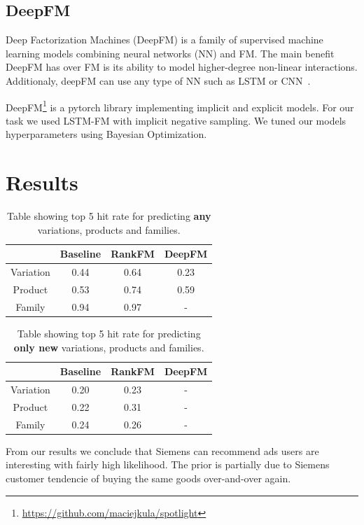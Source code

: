 \documentclass[fleqn,moreauthors,10pt]{ds_report}
\begin{document}
\pagebreak
\subsection*{DeepFM}

Deep Factorization Machines (DeepFM) is a family of supervised machine learning models combining neural networks (NN) and FM.
The main benefit DeepFM has over FM is its ability to model higher-degree non-linear interactions.
Additionaly, deepFM can use any type of NN such as LSTM or CNN~\cite{deepfm}.

DeepFM\footnote{\url{https://github.com/maciejkula/spotlight}} is a pytorch library implementing implicit and explicit models. 
For our task we used LSTM-FM with implicit negative sampling.
We tuned our models hyperparameters using Bayesian Optimization.

\section*{Results}

\begin{table}[H]
    \centering
    \begin{tabular}{c | c c c}
         & Baseline & RankFM & DeepFM  \\
         \hline
         Variation & 0.44 & 0.64 & 0.23 \\
         Product & 0.53 & 0.74 & 0.59 \\
         Family & 0.94 & 0.97 & -
    \end{tabular}
    \caption{Table showing top 5 hit rate for predicting \textbf{any} variations, products and families.}
    \label{popular}
\end{table}

\begin{table}[H]
    \centering
    \begin{tabular}{c | c c c}
         & Baseline & RankFM & DeepFM  \\
         \hline
         Variation & 0.20 & 0.23 & - \\
         Product & 0.22 & 0.31 & - \\
         Family & 0.24 & 0.26 & -
    \end{tabular}
    \caption{Table showing top 5 hit rate for predicting \textbf{only new} variations, products and families.}
    \label{popular_new}
\end{table}
From our results we conclude that Siemens can recommend ads users are interesting with fairly high likelihood.
The prior is partially due to Siemens customer tendencie of buying the same goods over-and-over again.
\end{document}
